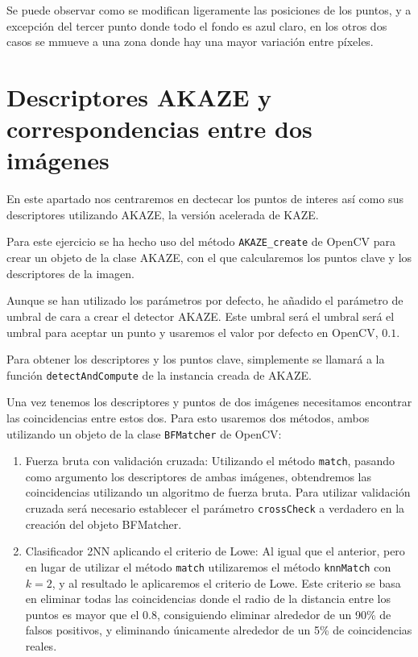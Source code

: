 \documentclass[12pt, spanish]{article}
\begin{document}
Se puede observar como se modifican ligeramente las posiciones de los puntos, y a excepción del tercer punto donde todo el fondo es azul claro, en los otros dos casos se mmueve a una zona donde hay una mayor variación entre píxeles.


\section{Descriptores AKAZE y correspondencias entre dos imágenes}

En este apartado nos centraremos en dectecar los puntos de interes así como sus descriptores utilizando AKAZE\cite{akaze}, la versión acelerada de KAZE\cite{kaze}.

Para este ejercicio se ha hecho uso del método \texttt{AKAZE\_create} de OpenCV para crear un objeto de la clase AKAZE, con el que calcularemos los puntos clave y los descriptores de la imagen.

Aunque se han utilizado los parámetros por defecto, he añadido el parámetro de umbral de cara a crear el detector AKAZE. Este umbral será el umbral será el umbral para aceptar un punto y usaremos el valor por defecto en OpenCV, $0.1$.

Para obtener los descriptores y los puntos clave, simplemente se llamará a la función \texttt{detectAndCompute} de la instancia creada de AKAZE.


Una vez tenemos los descriptores y puntos de dos imágenes necesitamos encontrar las coincidencias entre estos dos. Para esto usaremos dos métodos, ambos utilizando un objeto de la clase \texttt{BFMatcher} de OpenCV:

\begin{enumerate}
	\item Fuerza bruta con validación cruzada: Utilizando el método \texttt{match}, pasando como argumento los descriptores de ambas imágenes, obtendremos las coincidencias utilizando un algoritmo de fuerza bruta. Para utilizar validación cruzada será necesario establecer el parámetro \texttt{crossCheck} a verdadero en la creación del objeto BFMatcher.
	\item Clasificador 2NN aplicando el criterio de Lowe: Al igual que el anterior, pero en lugar de utilizar el método \texttt{match} utilizaremos el método \texttt{knnMatch} con $k = 2$, y al resultado le aplicaremos el criterio de Lowe. Este criterio se basa en eliminar todas las coincidencias donde el radio de la distancia entre los puntos es mayor que el $0.8$, consiguiendo eliminar alrededor de un 90\% de falsos positivos, y eliminando únicamente alrededor de un 5\% de coincidencias reales\cite{lowe}.
\end{enumerate}
\end{document}
